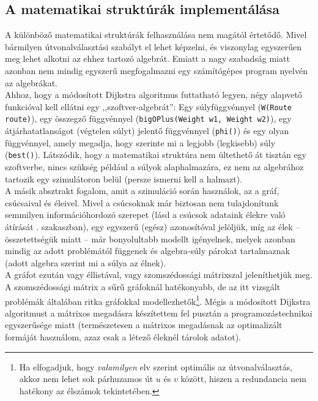     \subsection{A matematikai struktúrák implementálása}
    A különböző matematikai struktúrák felhasználása nem magától értetődő. Mivel bármilyen útvonalválasztási szabályt el lehet képzelni, és viszonylag egyszerűen meg lehet alkotni az ehhez tartozó algebrát. Emiatt a nagy szabadság miatt azonban nem mindig egyszerű megfogalmazni egy számítógépes program nyelvén az algebrákat.\\
    Ahhoz, hogy a módosított Dijkstra algoritmus futtatható legyen, négy alapvető funkcióval kell ellátni egy ,,szoftver-algebrát'': Egy súlyfüggvénnyel (\texttt{W(Route route)}), egy összegző függvénnyel (\texttt{bigOPlus(Weight w1, Weight w2)}), egy átjárhatatlanságot (végtelen súlyt) jelentő függvénnyel (\texttt{phi()}) és egy olyan függvénnyel, amely megadja, hogy szerinte mi a legjobb (legkisebb) súly (\texttt{best()}). Látszódik, hogy a matematikai struktúra nem ültethető át tisztán egy szoftverbe, nincs szükség például a súlyok alaphalmazára, ez nem az algebrához tartozik egy szimulátoron belül (persze ismerni kell a halmazt).\\

    A másik absztrakt fogalom, amit a szimuláció során használok, az a gráf, csúcsaival és éleivel. Mivel a csúcsoknak már biztosan nem tulajdonítunk semmilyen információhordozó szerepet (lásd a csúcsok adataink élekre való átírását . szakaszban), egy egyszerű (egész) azonosítóval jelöljük, míg az élek -- összetettségük miatt -- már bonyolultabb modellt igényelnek, melyek azonban mindig az adott problémától függenek és algebra-súly párokat tartalmaznak (adott algebra szerint mi a súlya az élnek).\\
    A gráfot ezután vagy éllistával, vagy szomszédossági mátrixszal jeleníthetjük meg. A szomszédossági mátrix a sűrű gráfoknál hatékonyabb, de az itt vizsgált problémák általában ritka gráfokkal modellezhetők\footnote{Ha elfogadjuk, hogy \textit{valamilyen} elv szerint optimális az útvonalválasztás, akkor nem lehet sok párhuzamos út $u$ és $v$ között, hiszen a redundancia nem hatékony az élszámok tekintetében.}. Mégis a módosított Dijkstra algoritmust a mátrixos megadásra készítettem fel pusztán a programozástechnikai egyszerűsége miatt (természetesen a mátrixos megadásnak az optimalizált formáját használom, azaz csak a létező éleknél tárolok adatot).

